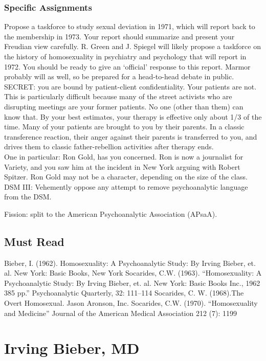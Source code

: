 \subsection{Specific Assignments}
\label{specificassignments}

Propose a taskforce to study sexual deviation in 1971, which will report back to the membership in 1973. Your report should summarize and present your Freudian view carefully.
R. Green and J. Spiegel will likely propose a taskforce on the history of homosexuality in psychiatry and psychology that will report in 1972. You should be ready to give an `official' response to this report. Marmor probably will as well, so be prepared for a head-to-head debate in public.
SECRET: you are bound by patient-client confidentiality. Your patients are not. This is particularly difficult because many of the street activists who are disrupting meetings are your former patients. No one (other than them) can know that. By your best estimates, your therapy is effective only about 1\slash 3 of the time. Many of your patients are brought to you by their parents. In a classic transference reaction, their anger against their parents is transferred to you, and drives them to classic father-rebellion activities after therapy ends.\\
One in particular: Ron Gold, has you concerned. Ron is now a journalist for Variety, and you saw him at the incident in New York arguing with Robert Spitzer. Ron Gold may not be a character, depending on the size of the class.
DSM III: Vehemently oppose any attempt to remove psychoanalytic language from the DSM.

Fission: split to the American Psychoanalytic Association (APsaA).

\section{Must Read}
\label{mustread}

Bieber, I. (1962). Homosexuality: A Psychoanalytic Study: By Irving Bieber, et. al. New York: Basic Books, New York
Socarides, C.W. (1963). “Homosexuality: A Psychoanalytic Study: By Irving Bieber, et. al. New York: Basic Books Inc., 1962 385 pp.” Psychoanalytic Quarterly, 32: 111--114
Socarides, C. W. (1968).The Overt Homosexual. Jason Aronson, Inc.
Socarides, C.W. (1970). “Homosexuality and Medicine” Journal of the American Medical Association 212 (7): 1199

\chapter{Irving Bieber, MD}
\label{irvingbiebermd}

